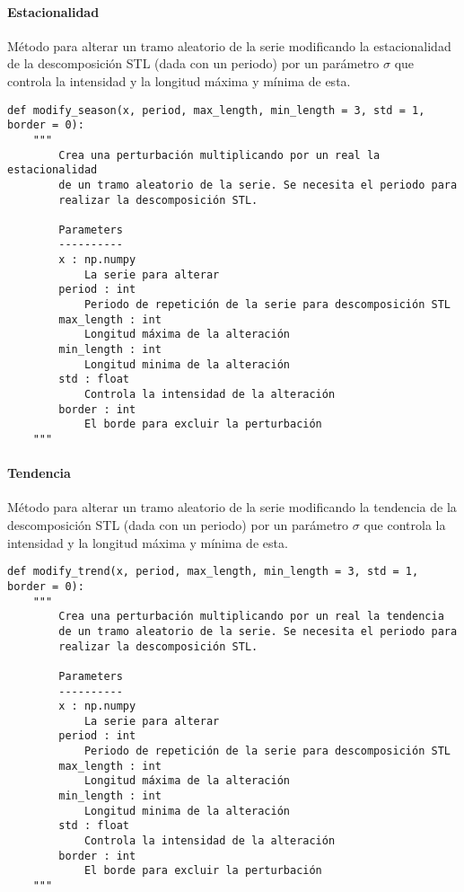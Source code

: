 \paragraph{Estacionalidad}

Método para alterar un tramo aleatorio de la serie modificando la estacionalidad de la descomposición STL (dada con un periodo) por un parámetro $\sigma$ que controla la intensidad y la longitud máxima y mínima de esta.

\begin{lstlisting}
def modify_season(x, period, max_length, min_length = 3, std = 1, border = 0):
    """
        Crea una perturbación multiplicando por un real la estacionalidad
        de un tramo aleatorio de la serie. Se necesita el periodo para
        realizar la descomposición STL.

        Parameters
        ----------
        x : np.numpy
            La serie para alterar
        period : int
            Periodo de repetición de la serie para descomposición STL
        max_length : int
            Longitud máxima de la alteración
        min_length : int
            Longitud minima de la alteración
        std : float
            Controla la intensidad de la alteración
        border : int
            El borde para excluir la perturbación
    """
\end{lstlisting}

\paragraph{Tendencia}

Método para alterar un tramo aleatorio de la serie modificando la tendencia de la descomposición STL (dada con un periodo) por un parámetro $\sigma$ que controla la intensidad y la longitud máxima y mínima de esta.

\begin{lstlisting}
def modify_trend(x, period, max_length, min_length = 3, std = 1, border = 0):
    """
        Crea una perturbación multiplicando por un real la tendencia
        de un tramo aleatorio de la serie. Se necesita el periodo para
        realizar la descomposición STL.

        Parameters
        ----------
        x : np.numpy
            La serie para alterar
        period : int
            Periodo de repetición de la serie para descomposición STL
        max_length : int
            Longitud máxima de la alteración
        min_length : int
            Longitud minima de la alteración
        std : float
            Controla la intensidad de la alteración
        border : int
            El borde para excluir la perturbación
    """
\end{lstlisting}

